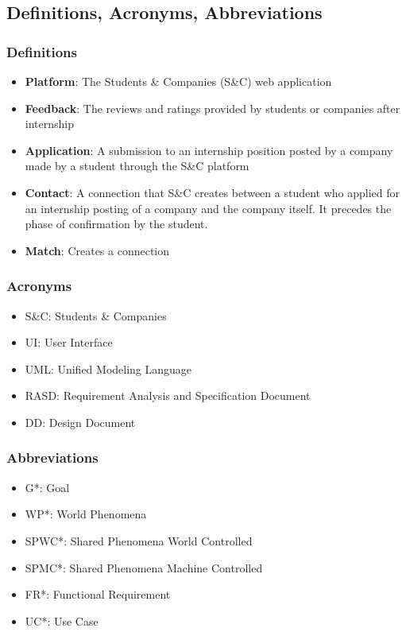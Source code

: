 \subsection{Definitions, Acronyms, Abbreviations}

    \subsubsection{Definitions}
        \begin{itemize}
            \item \textbf{Platform}: The Students \& Companies (S\&C) web application
            \item \textbf{Feedback}: The reviews and ratings provided by students or companies after internship
            \item \textbf{Application}: A submission to an internship position posted by a company made by a student through the S\&C platform  
            \item \textbf{Contact}: A connection that S\&C creates between a student who applied for an internship posting of a company and the company itself. It precedes the phase of confirmation by the student.
            \item \textbf{Match}: Creates a connection
        \end{itemize}

    
    \subsubsection{Acronyms}
        \begin{itemize}
            \item {S\&C: Students \& Companies}
            \item {UI: User Interface}
            \item {UML: Unified Modeling Language}
            \item {RASD: Requirement Analysis and Specification Document}
            \item {DD: Design Document}
        \end{itemize}
    

    \subsubsection{Abbreviations}
        \begin{itemize}
            \item {G*: Goal}
            \item {WP*: World Phenomena}
            \item {SPWC*: Shared Phenomena World Controlled}
            \item {SPMC*: Shared Phenomena Machine Controlled}
            \item {FR*: Functional Requirement}
            \item {UC*: Use Case}
        \end{itemize}

